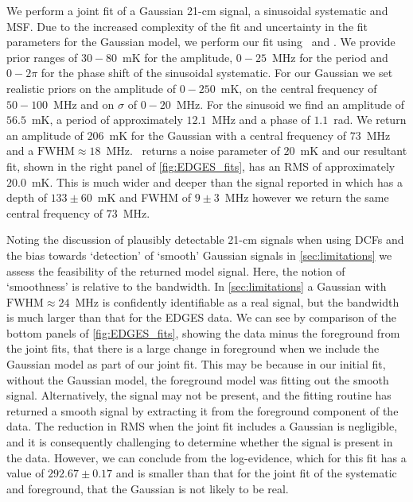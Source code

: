 We perform a joint fit of a Gaussian 21-cm signal, a sinusoidal systematic and MSF. Due to the increased complexity of the fit and uncertainty in the fit parameters for the Gaussian model, we perform our fit using \maxsmooth~and \multinest. We provide prior ranges of $30 - 80$~mK for the amplitude, $0 - 25$~MHz for the period and $0 - 2\pi$ for the phase shift of the sinusoidal systematic. For our Gaussian we set realistic priors on the amplitude of $0 - 250$~mK, on the central frequency of $50 - 100$~MHz and on $\sigma$ of $0 - 20$~MHz. For the sinusoid we find an amplitude of $56.5$~mK, a period of approximately $12.1$~MHz and a phase of $1.1$~rad. %
We return an amplitude of $206$~mK for the Gaussian with a central frequency of $73$~MHz and a $\mathrm{FWHM} \approx 18$~MHz. \multinest~returns a noise parameter of $20$~mK and our resultant fit, shown in the right panel of \cref{fig:EDGES_fits}, has an RMS of approximately $20.0$~mK. This is much wider and deeper than the signal reported in \cite{Singh_edges_2019} which has a depth of $133 \pm 60$~mK and FWHM of $9 \pm 3$~MHz however we return the same central frequency of $73$~MHz.

Noting the discussion of plausibly detectable 21-cm signals when using DCFs and the bias towards `detection' of `smooth' Gaussian signals in \cref{sec:limitations} we assess the feasibility of the returned model signal. Here, the notion of `smoothness' is relative to the bandwidth. In \cref{sec:limitations} a Gaussian with $\mathrm{FWHM} \approx 24$~MHz is confidently identifiable as a real signal, but the bandwidth is much larger than that for the EDGES data. We can see by comparison of the bottom panels of \cref{fig:EDGES_fits}, showing the data minus the foreground from the joint fits, that there is a large change in foreground when we include the Gaussian model as part of our joint fit. This may be because in our initial fit, without the Gaussian model, the foreground model was fitting out the smooth signal. Alternatively, the signal may not be present, and the fitting routine has returned a smooth signal by extracting it from the foreground component of the data. The reduction in RMS when the joint fit includes a Gaussian is negligible, and it is consequently challenging to determine whether the signal is present in the data. However, we can conclude from the log-evidence, which for this fit has a value of $292.67\pm0.17$ and is smaller than that for the joint fit of the systematic and foreground, that the Gaussian is not likely to be real.

